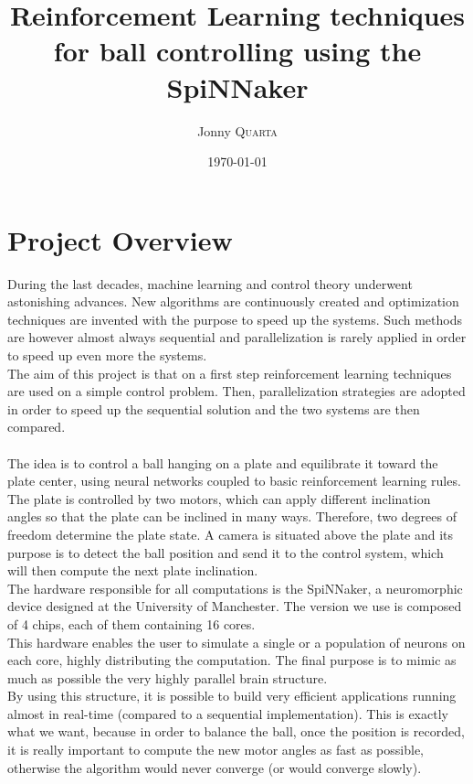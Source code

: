 \documentclass{article}
\title{\textbf{Reinforcement Learning techniques \\ for ball controlling using the SpiNNaker}} %
\author{Jonny \textsc{Quarta}} %
\date{\today} %
\affil{Ecole Polytechnique Federale de Lausanne}
\begin{document}
\maketitle %

\tableofcontents

\section{Project Overview}
During the last decades, machine learning and control theory underwent astonishing advances. New algorithms are continuously created and optimization techniques are invented with the purpose to speed up the systems. Such methods are however almost always sequential and parallelization is rarely applied in order to speed up even more the systems. \\

The aim of this project is that on a first step reinforcement learning techniques are used on a simple control problem. Then, parallelization strategies are adopted in order to speed up the sequential solution and the two systems are then compared. \\ \\

The idea is to control a ball hanging on a plate and equilibrate it toward the plate center, using neural networks coupled to basic reinforcement learning rules. The plate is controlled by two motors, which can apply different inclination angles so that the plate can be inclined in many ways. Therefore, two degrees of freedom determine the plate state. A camera is situated above the plate and its purpose is to detect the ball position and send it to the control system, which will then compute the next plate inclination.\\

The hardware responsible for all computations is the SpiNNaker, a neuromorphic device designed at the University of Manchester. The version we use is composed of 4 chips, each of them containing 16 cores.\\
This hardware enables the user to simulate a single or a population of neurons on each core, highly distributing the computation. The final purpose is to mimic as much as possible the very highly parallel brain structure. \\

By using this structure, it is possible to build very efficient applications running almost in real-time (compared to a sequential implementation). This is exactly what we want, because in order to balance the ball, once the position is recorded, it is really important to compute the new motor angles as fast as possible, otherwise the algorithm would never converge (or would converge slowly). \\ \\
\end{document}
